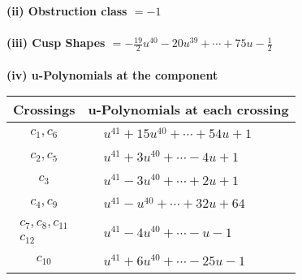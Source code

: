 \documentclass[1p]{elsarticle_modified}
\theoremstyle{definition}
\begin{document}
\flushleft \textbf{(ii) Obstruction class $= -1$}\\~\\
\flushleft \textbf{(iii) Cusp Shapes $= -\frac{19}{2} u^{40}-20 u^{39}+\cdots+75 u-\frac{1}{2}$}\\~\\
\newpage\renewcommand{\arraystretch}{1}
\flushleft \textbf{(iv) u-Polynomials at the component}\newline \\
\begin{tabular}{m{50pt}|m{274pt}}
Crossings & \hspace{64pt}u-Polynomials at each crossing \\
\hline $$\begin{aligned}c_{1},c_{6}\end{aligned}$$&$\begin{aligned}
&u^{41}+15 u^{40}+\cdots+54 u+1
\end{aligned}$\\
\hline $$\begin{aligned}c_{2},c_{5}\end{aligned}$$&$\begin{aligned}
&u^{41}+3 u^{40}+\cdots-4 u+1
\end{aligned}$\\
\hline $$\begin{aligned}c_{3}\end{aligned}$$&$\begin{aligned}
&u^{41}-3 u^{40}+\cdots+2 u+1
\end{aligned}$\\
\hline $$\begin{aligned}c_{4},c_{9}\end{aligned}$$&$\begin{aligned}
&u^{41}- u^{40}+\cdots+32 u+64
\end{aligned}$\\
\hline $$\begin{aligned}c_{7},c_{8},c_{11}\\c_{12}\end{aligned}$$&$\begin{aligned}
&u^{41}-4 u^{40}+\cdots- u-1
\end{aligned}$\\
\hline $$\begin{aligned}c_{10}\end{aligned}$$&$\begin{aligned}
&u^{41}+6 u^{40}+\cdots-25 u-1
\end{aligned}$\\
\hline
\end{tabular}\\~\\
\end{document}
